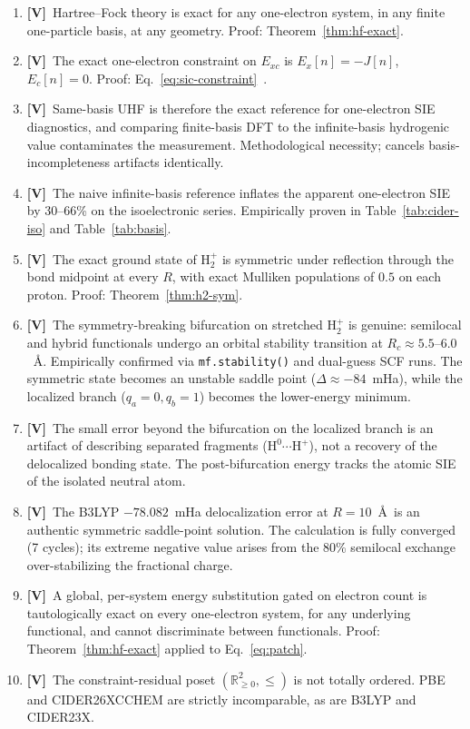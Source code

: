 \documentclass[11pt]{report}
\theoremstyle{definition}
\theoremstyle{remark}
\newcommand{\Exc}{E_{xc}}
\newcommand{\verified}[1]{\textbf{[V]}~#1}      %
\begin{document}
\begin{enumerate}
  \item \verified{Hartree--Fock theory is exact for any one-electron
        system, in any finite one-particle basis, at any geometry.}
        Proof: Theorem~\ref{thm:hf-exact}.
  \item \verified{The exact one-electron constraint on $\Exc$ is
        $E_x[n] = -J[n]$, $E_c[n] = 0$.} Proof:
        Eq.~\eqref{eq:sic-constraint}~\cite{PZ1981}.
  \item \verified{Same-basis UHF is therefore the exact reference for
        one-electron SIE diagnostics, and comparing finite-basis DFT to
        the infinite-basis hydrogenic value contaminates the measurement.}
        Methodological necessity; cancels basis-incompleteness artifacts identically.
  \item \verified{The naive infinite-basis reference inflates the apparent
        one-electron SIE by 30--66\% on the isoelectronic series.}
        Empirically proven in Table~\ref{tab:cider-iso} and Table~\ref{tab:basis}.
  \item \verified{The exact ground state of H$_2^+$ is symmetric under
        reflection through the bond midpoint at every $R$, with exact
        Mulliken populations of $0.5$ on each proton.}
        Proof: Theorem~\ref{thm:h2-sym}.
  \item \verified{The symmetry-breaking bifurcation on stretched H$_2^+$
        is genuine: semilocal and hybrid functionals undergo an orbital
        stability transition at $R_c \approx 5.5\text{--}6.0$~\AA.}
        Empirically confirmed via \texttt{mf.stability()} and dual-guess SCF
        runs. The symmetric state becomes an unstable saddle point ($\Delta \approx -84$~mHa),
        while the localized branch ($q_a=0, q_b=1$) becomes the lower-energy minimum.
  \item \verified{The small error beyond the bifurcation on the localized branch
        is an artifact of describing separated fragments ($\text{H}^0 \cdots \text{H}^+$),
        not a recovery of the delocalized bonding state.}
        The post-bifurcation energy tracks the atomic SIE of the isolated neutral atom.
  \item \verified{The B3LYP $-78.082$~mHa delocalization error at $R = 10$~\AA\
        is an authentic symmetric saddle-point solution.}
        The calculation is fully converged (7 cycles); its extreme negative value
        arises from the 80\% semilocal exchange over-stabilizing the fractional charge.
  \item \verified{A global, per-system energy substitution gated on
        electron count is tautologically exact on every one-electron
        system, for any underlying functional, and cannot discriminate
        between functionals.} Proof: Theorem~\ref{thm:hf-exact} applied to Eq.~\eqref{eq:patch}.
  \item \verified{The constraint-residual poset $(\mathbb{R}_{\ge 0}^2, \le)$ is not totally ordered.}
        PBE and CIDER26XCCHEM are strictly incomparable, as are B3LYP and CIDER23X.
\end{enumerate}
\end{document}
